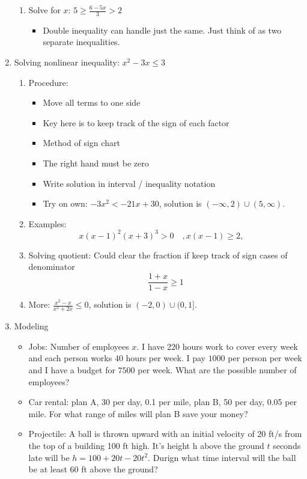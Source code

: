\documentclass{article}
\newcommand{\ds}{\displaystyle}
\begin{document}
\begin{enumerate}
\begin{enumerate}
\item Solve for $x$: $\ds 5 \geq \frac{6-5x}{3} > 2$
\begin{itemize}
\item Double inequality can handle just the same. Just think of as two separate inequalities. 
\end{itemize}
\end{enumerate}

\item Solving nonlinear inequality: $x^2-3x\leq 3$
\begin{enumerate}

\item Procedure:
\begin{itemize}
\item Move all terms to one side
\item Key here is to keep track of the sign of each factor
\item Method of sign chart
\item The right hand must be zero
\item Write solution in interval / inequality notation
\item Try on own: $-3x^2<-21x+30$, solution is $(-\infty,2)\cup (5,\infty)$.
\end{itemize}

\item Examples: 
$$
x(x-1)^2(x+3)^3 > 0\quad, x(x-1) \geq 2,\quad 
$$
\item Solving quotient: Could clear the fraction if keep track of sign cases of denominator
$$
\frac{1+x}{1-x} \geq 1
$$
\item More: $\displaystyle \frac{x^2-x}{x^2+2x}\leq 0$, solution is $(-2,0)\cup (0,1]$. 
\end{enumerate}

\item Modeling
\begin{itemize}
\item Jobs: Number of employees $x$. I have 220 hours work to cover every week and each person works 40 hours per week. I pay $1000$ per person per week and I have a budget for $7500$ per week. What are the possible number of employees?
\item Car rental: plan A, 30 per day, 0.1 per mile, plan B, 50 per day, 0.05 per mile. For what range of miles will plan B save your money?
\item Projectile: A ball is thrown upward with an initial velocity of 20 ft/s from the top of a building 100 ft high. It's height h above the ground $t$ seconds late will be $h = 100 + 20t-20t^2$. Durign what time interval will the ball be at least 60 ft above the ground?
\end{itemize}
\end{enumerate}
\end{document}

